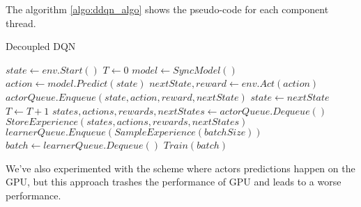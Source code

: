 The algorithm \ref{algo:ddqn_algo} shows the pseudo-code for each component thread.
\begin{algorithm}[h!]
    \caption{Decoupled DQN}\label{actor}
    \begin{algorithmic}
            \State $state \gets env.Start()$
            \State $T \gets 0$
                    \State $model \gets SyncModel()$
                \EndIf
                \State $action \gets model.Predict(state)$
                \State $nextState, reward \gets env.Act(action)$
                \State $actorQueue.Enqueue(state, action, reward, nextState)$
                \State $state \gets nextState$
                \State $T \gets T + 1$
            \EndWhile
        \EndProcedure
        \Statex
                \State $states, actions, rewards, nextStates \gets actorQueue.Dequeue()$
                \State $StoreExperience(states, actions, rewards, nextStates)$
                \State $learnerQueue.Enqueue(SampleExperience(batchSize))$
            \EndWhile
        \EndProcedure
        \Statex
                \State $batch \gets learnerQueue.Dequeue()$
                \State $Train(batch)$
            \EndFor
        \EndProcedure
    \end{algorithmic}
    \label{algo:ddqn_algo}
\end{algorithm}

We've also experimented with the scheme where actors predictions happen on the GPU, but this
approach trashes the performance of GPU and leads to a worse performance. %

